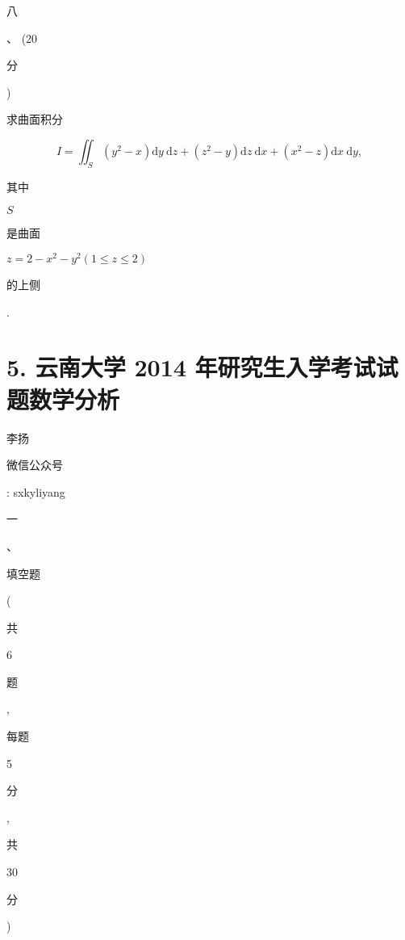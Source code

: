 \documentclass[10pt]{article}
\begin{document}
\begin{CJK}{UTF8}{mj}八\end{CJK}、 (20 \begin{CJK}{UTF8}{mj}分\end{CJK}) \begin{CJK}{UTF8}{mj}求曲面积分\end{CJK}
$$
I=\iint_{S}\left(y^{2}-x\right) \mathrm{d} y \mathrm{~d} z+\left(z^{2}-y\right) \mathrm{d} z \mathrm{~d} x+\left(x^{2}-z\right) \mathrm{d} x \mathrm{~d} y,
$$
\begin{CJK}{UTF8}{mj}其中\end{CJK} $S$ \begin{CJK}{UTF8}{mj}是曲面\end{CJK} $z=2-x^{2}-y^{2}(1 \leqslant z \leqslant 2)$ \begin{CJK}{UTF8}{mj}的上侧\end{CJK}.

\section{5. 云南大学 2014 年研究生入学考试试题数学分析}
\begin{CJK}{UTF8}{mj}李扬\end{CJK}

\begin{CJK}{UTF8}{mj}微信公众号\end{CJK}: sxkyliyang

\begin{CJK}{UTF8}{mj}一\end{CJK}、\begin{CJK}{UTF8}{mj}填空题\end{CJK} (\begin{CJK}{UTF8}{mj}共\end{CJK} 6 \begin{CJK}{UTF8}{mj}题\end{CJK}, \begin{CJK}{UTF8}{mj}每题\end{CJK} 5 \begin{CJK}{UTF8}{mj}分\end{CJK}, \begin{CJK}{UTF8}{mj}共\end{CJK} 30 \begin{CJK}{UTF8}{mj}分\end{CJK})
\end{document}
